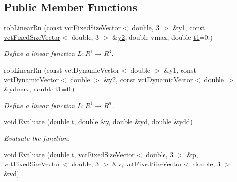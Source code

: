 \subsection*{Public Member Functions}
\begin{DoxyCompactItemize}
\item 
\hyperlink{classrob_linear_rn_a85534f130d03d7b490b56248a661621e}{rob\-Linear\-Rn} (const \hyperlink{classvct_fixed_size_vector}{vct\-Fixed\-Size\-Vector}$<$ double, 3 $>$ \&\hyperlink{classrob_function_rn_aadf26230a697fedca000dac29ae27129}{y1}, const \hyperlink{classvct_fixed_size_vector}{vct\-Fixed\-Size\-Vector}$<$ double, 3 $>$ \&\hyperlink{classrob_function_rn_a982a35e7e6f235da34765d3ceeb91109}{y2}, double vmax, double \hyperlink{classrob_function_a9a4b408a3a5a8ae927caec3b6bac36ef}{t1}=0.)
\begin{DoxyCompactList}\small\item\em Define a linear function $L: R^1\rightarrow R^3 $. \end{DoxyCompactList}\item 
\hyperlink{classrob_linear_rn_ab78451ca7c06ad11af49d7fb2e5fadc3}{rob\-Linear\-Rn} (const \hyperlink{classvct_dynamic_vector}{vct\-Dynamic\-Vector}$<$ double $>$ \&\hyperlink{classrob_function_rn_aadf26230a697fedca000dac29ae27129}{y1}, const \hyperlink{classvct_dynamic_vector}{vct\-Dynamic\-Vector}$<$ double $>$ \&\hyperlink{classrob_function_rn_a982a35e7e6f235da34765d3ceeb91109}{y2}, const \hyperlink{classvct_dynamic_vector}{vct\-Dynamic\-Vector}$<$ double $>$ \&ydmax, double \hyperlink{classrob_function_a9a4b408a3a5a8ae927caec3b6bac36ef}{t1}=0.)
\begin{DoxyCompactList}\small\item\em Define a linear function $L: R^1\rightarrow R^n $. \end{DoxyCompactList}\item 
void \hyperlink{classrob_linear_rn_a7d73424d71bc54c111e7a178b66dcd6a}{Evaluate} (double t, double \&y, double \&yd, double \&ydd)
\begin{DoxyCompactList}\small\item\em Evaluate the function. \end{DoxyCompactList}\item 
void \hyperlink{classrob_linear_rn_a1a7e3eddb0068e2d0beaff9c270d3f7d}{Evaluate} (double t, \hyperlink{classvct_fixed_size_vector}{vct\-Fixed\-Size\-Vector}$<$ double, 3 $>$ \&p, \hyperlink{classvct_fixed_size_vector}{vct\-Fixed\-Size\-Vector}$<$ double, 3 $>$ \&v, \hyperlink{classvct_fixed_size_vector}{vct\-Fixed\-Size\-Vector}$<$ double, 3 $>$ \&vd)

\end{DoxyCompactItemize}
